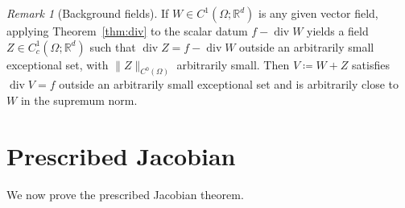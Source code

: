 \documentclass[11pt,a4paper]{article}
\newcommand{\R}{\mathbb{R}}
\newcommand{\diver}{\operatorname{div}}
\theoremstyle{definition}
\theoremstyle{remark}
\newtheorem{rem}[thm]{Remark}
\begin{document}
\begin{rem}[Background fields]\label{rem:background-div}
If $W\in C^1(\Omega;\R^d)$ is any given vector field, applying Theorem~\ref{thm:div} to the scalar datum $f-\diver W$ yields a field $Z\in C^1_c(\Omega;\R^d)$ such that $\diver Z=f-\diver W$
outside an arbitrarily small exceptional set, with $\|Z\|_{C^{0}(\Omega)}$ arbitrarily small.
Then $V\coloneqq W+Z$ satisfies $\diver V=f$ outside an arbitrarily small exceptional set and is arbitrarily close to $W$ in the supremum norm.
\end{rem}

\section{Prescribed Jacobian}

We now prove the prescribed Jacobian theorem.
\end{document}
